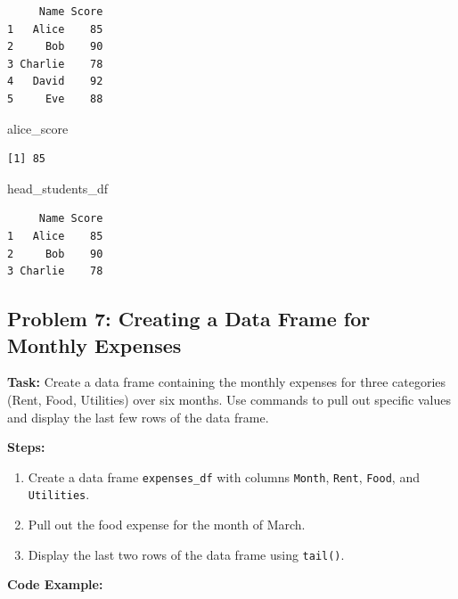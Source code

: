 \documentclass[
  letterpaper,
  DIV=11,
  numbers=noendperiod]{scrreprt}
\newenvironment{Shaded}{\begin{snugshade}}{\end{snugshade}}
\newcommand{\NormalTok}[1]{\textcolor[rgb]{0.00,0.23,0.31}{#1}}
\providecommand{\tightlist}{%
  \setlength{\itemsep}{0pt}\setlength{\parskip}{0pt}}\usepackage{longtable,booktabs,array}
\begin{document}
\begin{verbatim}
     Name Score
1   Alice    85
2     Bob    90
3 Charlie    78
4   David    92
5     Eve    88
\end{verbatim}

\begin{Shaded}
\begin{Highlighting}[]
\NormalTok{alice\_score}
\end{Highlighting}
\end{Shaded}

\begin{verbatim}
[1] 85
\end{verbatim}

\begin{Shaded}
\begin{Highlighting}[]
\NormalTok{head\_students\_df}
\end{Highlighting}
\end{Shaded}

\begin{verbatim}
     Name Score
1   Alice    85
2     Bob    90
3 Charlie    78
\end{verbatim}

\subsection*{Problem 7: Creating a Data Frame for Monthly
Expenses}\label{problem-7-creating-a-data-frame-for-monthly-expenses}

\textbf{Task:} Create a data frame containing the monthly expenses for
three categories (Rent, Food, Utilities) over six months. Use commands
to pull out specific values and display the last few rows of the data
frame.

\textbf{Steps:}

\begin{enumerate}
\def\labelenumi{\arabic{enumi}.}
\tightlist
\item
  Create a data frame \texttt{expenses\_df} with columns \texttt{Month},
  \texttt{Rent}, \texttt{Food}, and \texttt{Utilities}.
\item
  Pull out the food expense for the month of March.
\item
  Display the last two rows of the data frame using \texttt{tail()}.
\end{enumerate}

\textbf{Code Example:}
\end{document}
